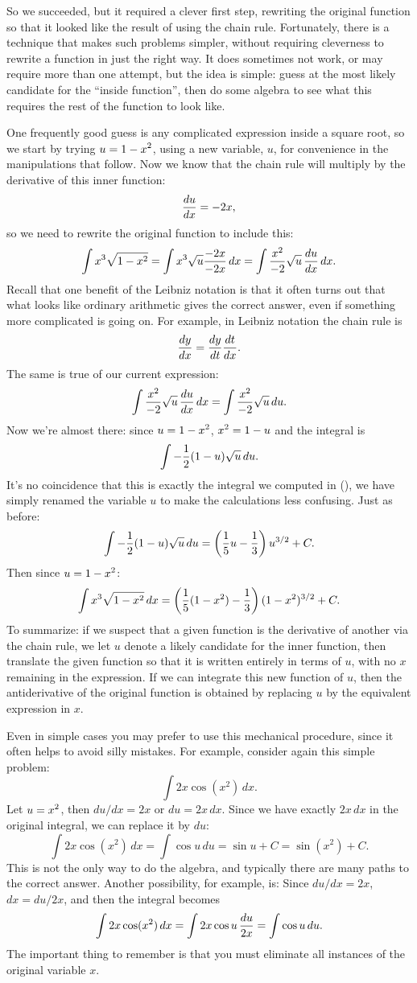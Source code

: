 So we succeeded, but it required a clever first step, rewriting the
original function so that it looked like the result of using the chain
rule. Fortunately, there is a technique that makes such problems
simpler, without requiring cleverness to rewrite a function in just
the right way. It does sometimes not work, or may require more than one
attempt, but the idea is simple: guess at the most likely candidate for
the ``inside function'', then do some algebra to see what this
requires the rest of the function to look like.

One frequently good guess is any complicated expression inside a
square root, so we start by trying $\displaystyle u=1-x^2$, using a new variable,
$u$, for convenience in the manipulations that follow. Now we know
that the chain rule will multiply by the derivative of this inner
function:
$${du\over dx} = -2x,$$
so we need to rewrite the original function to include this:
$$
  \int x^3\sqrt{1-x^2}=\int x^3\sqrt{u}{-2x\over-2x}\,dx=
  \int {x^2\over-2}\sqrt{u}\,{du\over dx}\,dx.
$$ 
Recall that one benefit of the Leibniz notation is that it often turns out
that what looks like ordinary arithmetic gives the correct answer,
even if something more complicated is going on. For example, in
Leibniz notation the chain rule is
$${dy\over dx}={dy\over dt}{dt\over dx}.$$
The same is true of our current expression:
$$
  \int {x^2\over-2}\sqrt{u}\,{du\over dx}\,dx=
  \int {x^2\over-2}\sqrt{u}\,du.
$$
Now we're almost there: since $\displaystyle u=1-x^2$, $\displaystyle x^2=1-u$ and the integral is
$$\int -{1\over2}(1-u)\sqrt{u}\,du.$$
It's no coincidence that this is exactly the integral we computed in
(), 
we have simply renamed the variable $u$ to make the
calculations less confusing. Just as before:
$$
  \int-{1\over2}(1-u)\sqrt{u}\,du=
  \left({1\over5}u-{1\over3}\right)u^{3/2}+C.
$$
Then since $\displaystyle u=1-x^2$:
$$
  \int x^3\sqrt{1-x^2}\,dx=\left({1\over5}(1-x^2)-{1\over3}\right)
  (1-x^2)^{3/2}+C.
$$
To summarize: if we suspect that a given function is the derivative of
another via the chain rule, we let $u$ denote a likely candidate for
the inner function, then translate the given function so that it is
written entirely in terms of $u$, with no $x$ remaining in the
expression. If we can integrate this new function of $u$, then the
antiderivative of the original function is obtained by replacing $u$
by the equivalent expression in $x$.

Even in simple cases you may prefer to use this mechanical procedure,
since it often helps to avoid silly mistakes. For example, consider
again this simple problem:
$$\int 2x\cos(x^2)\,dx.$$
Let $\displaystyle u=x^2$, then $du/dx = 2x$ or $du = 2x\,dx$. Since we have exactly 
$2x\,dx$ in the original integral, we can replace it by $du$:
$$\int 2x\cos(x^2)\,dx=\int \cos u\,du=\sin u +C = \sin(x^2)+C.$$
This is not the only way to do the algebra, and typically there are
many paths to the correct answer. Another possibility, for example,
is: Since $du/dx = 2x$, $dx=du/2x$, and then the integral becomes
$$\int 2x\cos(x^2)\,dx=\int 2x\cos u\,{du\over 2x}=\int \cos u\,du.$$
The important thing to remember is that you must eliminate all
instances of the original variable $x$.

